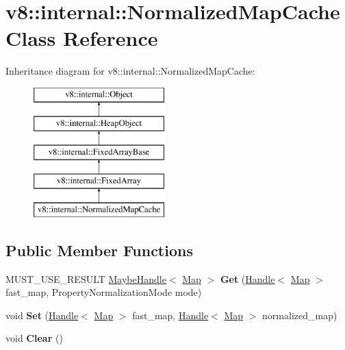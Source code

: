 \hypertarget{classv8_1_1internal_1_1_normalized_map_cache}{}\section{v8\+:\+:internal\+:\+:Normalized\+Map\+Cache Class Reference}
\label{classv8_1_1internal_1_1_normalized_map_cache}
Inheritance diagram for v8\+:\+:internal\+:\+:Normalized\+Map\+Cache\+:\begin{figure}[H]
\begin{center}
\leavevmode
\includegraphics[height=5.000000cm]{classv8_1_1internal_1_1_normalized_map_cache}
\end{center}
\end{figure}
\subsection*{Public Member Functions}
\begin{DoxyCompactItemize}
\item 
M\+U\+S\+T\+\_\+\+U\+S\+E\+\_\+\+R\+E\+S\+U\+LT \hyperlink{classv8_1_1internal_1_1_maybe_handle}{Maybe\+Handle}$<$ \hyperlink{classv8_1_1internal_1_1_map}{Map} $>$ {\bfseries Get} (\hyperlink{classv8_1_1internal_1_1_handle}{Handle}$<$ \hyperlink{classv8_1_1internal_1_1_map}{Map} $>$ fast\+\_\+map, Property\+Normalization\+Mode mode)\hypertarget{classv8_1_1internal_1_1_normalized_map_cache_a503caab7bc065d42afa3b68c73699ccf}{}\label{classv8_1_1internal_1_1_normalized_map_cache_a503caab7bc065d42afa3b68c73699ccf}

\item 
void {\bfseries Set} (\hyperlink{classv8_1_1internal_1_1_handle}{Handle}$<$ \hyperlink{classv8_1_1internal_1_1_map}{Map} $>$ fast\+\_\+map, \hyperlink{classv8_1_1internal_1_1_handle}{Handle}$<$ \hyperlink{classv8_1_1internal_1_1_map}{Map} $>$ normalized\+\_\+map)\hypertarget{classv8_1_1internal_1_1_normalized_map_cache_ae23fb7f8d42ba9350ade6f64bed55054}{}\label{classv8_1_1internal_1_1_normalized_map_cache_ae23fb7f8d42ba9350ade6f64bed55054}

\item 
void {\bfseries Clear} ()\hypertarget{classv8_1_1internal_1_1_normalized_map_cache_a79ea7891816a709ad98ffbea0764b4e2}{}\label{classv8_1_1internal_1_1_normalized_map_cache_a79ea7891816a709ad98ffbea0764b4e2}

\end{DoxyCompactItemize}
